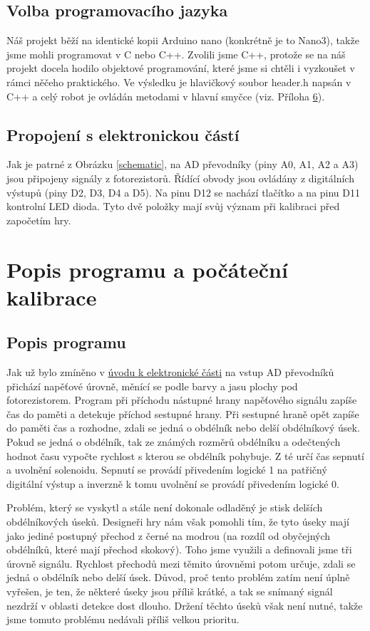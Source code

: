 \documentclass[12pt,oneside]{book} %
\begin{document}
\section{Volba programovacího jazyka}
\qquad Náš projekt běží na identické kopii Arduino nano (konkrétně je to Nano3), takže jsme mohli programovat v C nebo C++. Zvolili jsme C++, protože se na náš projekt docela hodilo objektové programování, které jsme si chtěli i vyzkoušet v rámci něčeho praktického. Ve výsledku je hlavičkový soubor header.h napsán v C++ a celý robot je ovládán metodami v hlavní smyčce (viz. Příloha \hyperref[Prilohy]{6}).

\section{Propojení s elektronickou částí}
Jak je patrné z Obrázku \ref{schematic}, na AD převodníky (piny A0, A1, A2 a A3) jsou připojeny signály z fotorezistorů. Řídící obvody jsou ovládány z digitálních výstupů (piny D2, D3, D4 a D5). Na pinu D12 se nachází tlačítko a na pinu D11 kontrolní LED dioda. Tyto dvě položky mají svůj význam při kalibraci před započetím hry.

\chapter{Popis programu a počáteční kalibrace}\label{progNavod}
\section{Popis programu}\label{progpopis}

\qquad Jak už bylo zmíněno v \hyperref[uvodelektro]{úvodu k elektronické části} na vstup AD převodníků přichází napěťové úrovně, měnící se podle barvy a jasu plochy pod fotorezistorem. Program při příchodu nástupné hrany napěťového signálu zapíše čas do paměti a detekuje příchod sestupné hrany. Při sestupné hraně opět zapíše do paměti čas a rozhodne, zdali se jedná o obdélník nebo delší obdélníkový úsek. Pokud se jedná o obdélník, tak ze známých rozměrů obdélníku a odečtených hodnot času vypočte rychlost s kterou se obdélník pohybuje. Z té určí čas sepnutí a uvolnění solenoidu. Sepnutí se provádí přivedením logické 1 na patřičný digitální výstup a inverzně k tomu uvolnění se provádí přivedením logické 0.

\qquad Problém, který se vyskytl a stále není dokonale odladěný je stisk delších obdélníkových úseků. Designeři hry nám však pomohli tím, že tyto úseky mají jako jediné postupný přechod z černé na modrou (na rozdíl od obyčejných obdélníků, které mají přechod skokový). Toho jsme využili a definovali jsme tři úrovně signálu. Rychlost přechodů mezi těmito úrovněmi potom určuje, zdali se jedná o obdélník nebo delší úsek. Důvod, proč tento problém zatím není úplně vyřešen, je ten, že některé úseky jsou příliš krátké, a tak se snímaný signál nezdrží v oblasti detekce dost dlouho. Držení těchto úseků však není nutné, takže jsme tomuto problému nedávali příliš velkou prioritu.
\end{document}
